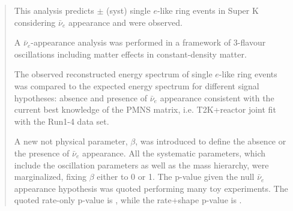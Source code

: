 \begin{frontmatter}
\begin{abstract}
This analysis predicts 
\NskOscExpectation{} $\pm$ \NskOscExpectationError{} (syst)
single $e$-like ring events in Super K  considering $\bar{\nu}_e$ appearance
and  
\NskObserved{} 
were observed. 



A $\bar{\nu}_{e}$-appearance analysis was performed 
in a framework of 3-flavour oscillations including matter effects in constant-density matter.

The observed reconstructed energy spectrum of single $e$-like ring events was compared
to the expected energy spectrum for different signal hypotheses: absence and presence of $\bar{\nu}_e$
appearance consistent with the current best knowledge of the PMNS matrix,
i.e. T2K+reactor joint fit with the Run1-4 data set.

A new not physical parameter, $\beta$, was introduced to define the absence or the presence 
of $\bar{\nu}_e$ appearance.
All the \NSyst{} systematic parameters, which include the oscillation parameters as well as the mass hierarchy, were marginalized,
fixing $\beta$ either to 0 or 1.
The p-value given the null $\bar{\nu}_e$ appearance hypothesis was quoted
performing many toy experiments.
The quoted rate-only p-value is \PvalueRate, while the rate+shape p-value is \PvalueShape.



\end{abstract}
\end{frontmatter}
